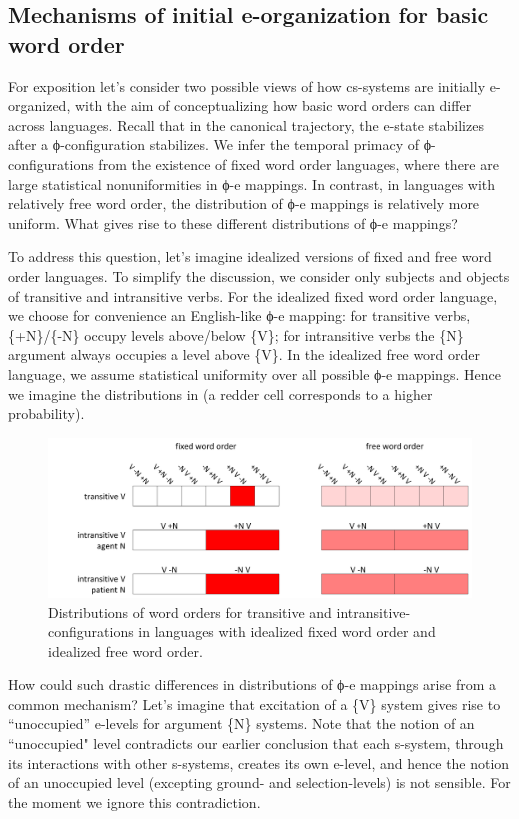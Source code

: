 \subsection{Mechanisms of initial e-organization for basic word order}

For exposition let's consider two possible views of how cs-systems are initially e-organized, with the aim of conceptualizing how basic word orders can differ across languages. Recall that in the canonical trajectory, the e-state stabilizes after a ϕ-configuration stabilizes. We infer the temporal primacy of ϕ-configurations from the existence of fixed word order languages, where there are large statistical nonuniformities in ϕ-e mappings. In contrast, in languages with relatively free word order, the distribution of ϕ-e mappings is relatively more uniform. What gives rise to these different distributions of ϕ-e mappings?

  To address this question, let's imagine idealized versions of fixed and free word order languages. To simplify the discussion, we consider only subjects and objects of transitive and intransitive verbs. For the idealized fixed word order language, we choose for convenience an English-like ϕ-e mapping: for transitive verbs, \{+N\}/\{-N\} occupy levels above/below \{V\}; for intransitive verbs the \{N\} argument always occupies a level above \{V\}. In the idealized free word order language, we assume statistical uniformity over all possible ϕ-e mappings. Hence we imagine the distributions in {} (a redder cell corresponds to a higher probability).

  
\begin{figure}
\includegraphics[width=\textwidth]{figures/Tilsen-img74.png}
\caption{Distributions of word orders for transitive and intransitive-configurations in languages with idealized fixed word order and idealized free word order.}
\label{fig:4:24}
\end{figure}
 

  How could such drastic differences in distributions of ϕ{}-e mappings arise from a common mechanism? Let's imagine that excitation of a \{V\} system gives rise to “unoccupied” e-levels for argument \{N\} systems. Note that the notion of an “unoccupied" level contradicts our earlier conclusion that each s-system, through its interactions with other s-systems, creates its own e-level, and hence the notion of an unoccupied level (excepting ground- and selection-levels) is not sensible. For the moment we ignore this contradiction.

